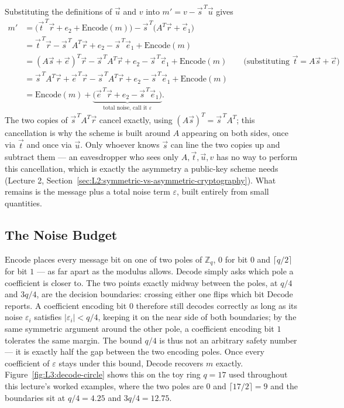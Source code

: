 Substituting the definitions of $\vec u$ and $v$ into $m' = v - \vec s^{\,T}\vec u$ gives
\begin{align*}
m' &= \big(\vec t^{\,T}\vec r + e_2 + \mathrm{Encode}(m)\big) - \vec s^{\,T}\big(A^T\vec r + \vec e_1\big) \\
&= \vec t^{\,T}\vec r - \vec s^{\,T}A^T\vec r + e_2 - \vec s^{\,T}\vec e_1 + \mathrm{Encode}(m) \\
&= (A\vec s + \vec e)^T \vec r - \vec s^{\,T}A^T\vec r + e_2 - \vec s^{\,T}\vec e_1 + \mathrm{Encode}(m) \qquad \text{(substituting } \vec t = A\vec s+\vec e\text{)}\\
&= \vec s^{\,T}A^T\vec r + \vec e^{\,T}\vec r - \vec s^{\,T}A^T\vec r + e_2 - \vec s^{\,T}\vec e_1 + \mathrm{Encode}(m) \\
&= \mathrm{Encode}(m) + \underbrace{\big(\vec e^{\,T}\vec r + e_2 - \vec s^{\,T}\vec e_1\big)}_{\text{total noise, call it } \varepsilon}.
\end{align*}
The two copies of $\vec s^{\,T}A^T\vec r$ cancel exactly, using $(A\vec s)^T=\vec s^{\,T}A^T$; this cancellation is why the scheme is built around $A$ appearing on both sides, once via $\vec t$ and once via $\vec u$. Only whoever knows $\vec s$ can line the two copies up and subtract them --- an eavesdropper who sees only $A,\vec t,\vec u,v$ has no way to perform this cancellation, which is exactly the asymmetry a public-key scheme needs (Lecture 2, Section~\ref{sec:L2:symmetric-vs-asymmetric-cryptography}). What remains is the message plus a total noise term $\varepsilon$, built entirely from small quantities.

\subsection{The Noise Budget}
\label{sec:L3:noise-budget-in-numbers}

$\mathrm{Encode}$ places every message bit on one of two poles of $\mathbb{Z}_q$, $0$ for bit $0$ and $\lceil q/2\rceil$ for bit $1$ --- as far apart as the modulus allows. $\mathrm{Decode}$ simply asks which pole a coefficient is closer to. The two points exactly midway between the poles, at $q/4$ and $3q/4$, are the decision boundaries: crossing either one flips which bit $\mathrm{Decode}$ reports. A coefficient encoding bit $0$ therefore still decodes correctly as long as its noise $\varepsilon_i$ satisfies $|\varepsilon_i| < q/4$, keeping it on the near side of both boundaries; by the same symmetric argument around the other pole, a coefficient encoding bit $1$ tolerates the same margin. The bound $q/4$ is thus not an arbitrary safety number --- it is exactly half the gap between the two encoding poles. Once every coefficient of $\varepsilon$ stays under this bound, $\mathrm{Decode}$ recovers $m$ exactly. Figure~\ref{fig:L3:decode-circle} shows this on the toy ring $q=17$ used throughout this lecture's worked examples, where the two poles are $0$ and $\lceil17/2\rceil=9$ and the boundaries sit at $q/4=4.25$ and $3q/4=12.75$.

